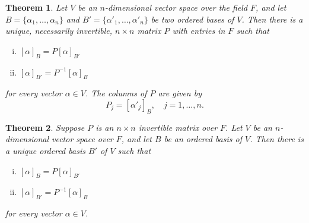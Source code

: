 \documentclass{article}
\newtheorem{theorem}{Theorem}
\begin{document}
\begin{theorem}
  Let $V$ be an $n$-dimensional vector space over the field $F$, and let $B = \{
  \alpha_1, \ldots, \alpha_n\}$ and $B' = \{\alpha'_1, \ldots, \alpha'_n\}$ be
  two ordered bases of $V$. Then there is a unique, necessarily invertible, $n
  \times n$ matrix $P$ with entries in $F$ such that
  \begin{enumerate}[(i)]
    \item $[\alpha]_B = P[\alpha]_{B'}$
    \item $[\alpha]_{B'} = P^{-1}[\alpha]_B$
  \end{enumerate}
  for every vector $\alpha \in V$. The columns of $P$ are given by \[
    P_j = [\alpha'_j]_B,\quad j = 1, \ldots, n.
  \]
\end{theorem}

\begin{theorem}
  Suppose $P$ is an $n \times n$ invertible matrix over $F$. Let $V$ be an
  $n$-dimensional vector space over $F$, and let $B$ be an ordered basis of $V$.
  Then there is a unique ordered basis $B'$ of $V$ such that
  \begin{enumerate}[(i)]
    \item $[\alpha]_B = P[\alpha]_{B'}$
    \item $[\alpha]_{B'} = P^{-1}[\alpha]_B$
  \end{enumerate}
  for every vector $\alpha \in V$.
\end{theorem}
\end{document}
